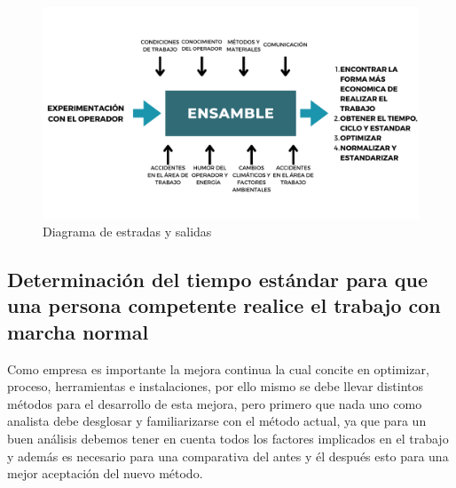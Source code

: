     \begin{figure}[H] 
        \centering
        \includegraphics[trim = {12mm 20mm 10mm 14mm},clip,scale=0.15]{22/Img/diagramaEntradasSalidas.pdf}
        \caption{Diagrama de estradas y salidas}
        \label{fig:diagrama}
    \end{figure}
    
    \subsection{Determinación del tiempo estándar para que una persona competente realice el trabajo con marcha normal}
    
    Como empresa es importante la mejora continua la cual concite en optimizar, proceso, herramientas e instalaciones, por ello mismo se debe llevar distintos métodos para el desarrollo de esta mejora, pero primero que nada uno como analista debe desglosar y familiarizarse con el método actual, ya que para un buen análisis debemos tener en cuenta todos los factores implicados en el trabajo y además es necesario para una comparativa del antes y él después esto para una mejor aceptación del nuevo método.
    
